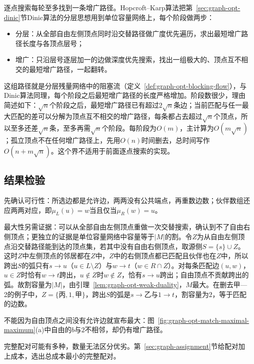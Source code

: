逐点搜索每轮至多找到一条增广路径。Hopcroft--Karp算法把第~\ref{sec:graph-opt-dinic}节Dinic算法的分层思想用到单位容量网络上，每个阶段做两步：
\begin{itemize}
  \item 分层：从全部自由左侧顶点同时沿交替路径做广度优先遍历，求出最短增广路径长度与各顶点层号；
  \item 增广：只沿层号逐层加一的边做深度优先搜索，找出一组极大的、顶点互不相交的最短增广路径，一起翻转。
\end{itemize}
这组路径就是分层残量网络中的阻塞流（定义~\ref{def:graph-opt-blocking-flow}），与Dinic算法同理，每个阶段之后最短增广路径的长度严格增加。阶段数很少，理由简述如下：$\sqrt n$个阶段之后，最短增广路径已有超过$2\sqrt n$条边；当前匹配与任一最大匹配的差可以分解为顶点互不相交的增广路径，每条都占去超过$\sqrt n$个顶点，所以至多还差$\sqrt n$条，至多再需$\sqrt n$个阶段。每阶段为$O(m)$，主计算为$O(m\sqrt n)$；孤立顶点不在任何增广路径上，先用$O(n)$时间删去，总时间写作$O(n+m\sqrt n)$。这个界不适用于前面逐点搜索的实现。

\subsection{结果检验}
\label{sec:graph-opt-match-analysis}

先确认可行性：所选边都是允许边，两两没有公共端点，再重数边数；伙伴数组还应两两对应，即$\mu_L(u)=w$当且仅当$\mu_R(w)=u$。

最大性另需证据：可以从全部自由左侧顶点重做一次交替搜索，确认到不了自由右侧顶点；更独立的证据是单位容量网络中容量等于$|M|$的割。令$Z$为从自由左侧顶点沿交替路径能到达的顶点集，若其中没有自由右侧顶点，取源侧$S=\{s\}\cup Z$。这时$Z$中左侧顶点的邻居都在$Z$中，$Z$中的右侧顶点都已匹配且伙伴也在$Z$中，所以跨出$S$的弧只有$s\to u$（$u\in L\setminus Z$）与$w\to t$（$w\in R\cap Z$）。对每条匹配边$(u,w)$，$u\in Z$时恰有$w\to t$跨出，$u\notin Z$时$w\notin Z$，恰有$s\to u$跨出；自由顶点不贡献跨出的弧。故割容量为$|M|$，由引理~\ref{lem:graph-opt-weak-duality}，$M$最大。在删去甲—2的例子中，$Z=\{\text{丙},1,\text{甲}\}$，跨出$S$的弧是$s\to\text{乙}$与$1\to t$，割容量为$2$，等于匹配的边数。

不能因为自由顶点之间没有允许边就宣布最大：图~\ref{fig:graph-opt-match-maximal-maximum}(a)中自由的$b$与$2$不相邻，却仍有增广路径。

完整配对可能有多种，数量无法区分优劣。第~\ref{sec:graph-assignment}节给配对加上成本，选出总成本最小的完整配对。
